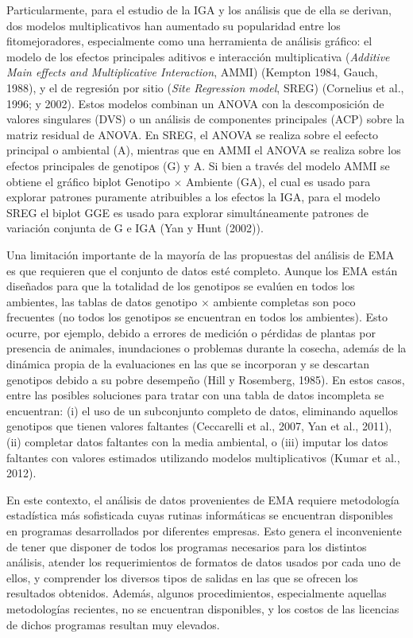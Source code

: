Particularmente, para el estudio de la IGA y los análisis que de ella se derivan, dos modelos multiplicativos han aumentado su popularidad entre los fitomejoradores, especialmente como una herramienta de análisis gráfico: el modelo de los efectos principales aditivos e interacción multiplicativa (\emph{Additive Main effects and Multiplicative Interaction}, AMMI) (Kempton 1984, Gauch, 1988), y el de regresión por sitio (\emph{Site Regression model}, SREG) (Cornelius et al., 1996; \citet{GauchZobel1997} y 2002).  Estos modelos combinan un ANOVA con la descomposición de valores singulares (DVS) o un análisis de componentes principales (ACP) sobre la matriz residual de ANOVA. En SREG, el ANOVA se realiza sobre el eefecto principal o ambiental (A),  mientras que en AMMI el ANOVA se realiza sobre los efectos principales de genotipos (G) y A. Si bien a través del modelo AMMI se obtiene el gráfico biplot Genotipo $\times$ Ambiente (GA), el cual es usado para explorar patrones puramente atribuibles a los efectos la IGA, para el modelo SREG el biplot GGE es usado para explorar simultáneamente patrones de variación conjunta de G e IGA (Yan y Hunt (2002)).

Una limitación importante de la mayoría de las propuestas del análisis de EMA es que requieren que el conjunto de datos esté completo. Aunque los EMA están diseñados para que la totalidad de los genotipos se evalúen en todos los ambientes,  las tablas de datos genotipo $\times$ ambiente completas son poco frecuentes (no todos los genotipos se encuentran en todos los ambientes). Esto ocurre, por ejemplo, debido a errores de medición o pérdidas de plantas por presencia de animales, inundaciones o problemas durante la cosecha, además de la dinámica propia de la evaluaciones en las que se incorporan y se descartan genotipos debido a su pobre desempeño (Hill y Rosemberg, 1985). En estos casos, entre las posibles soluciones para tratar con una tabla de datos incompleta se encuentran: (i) el uso de un subconjunto completo de datos, eliminando aquellos genotipos que tienen valores faltantes (Ceccarelli et al., 2007, Yan et al., 2011), (ii) completar datos faltantes con la media ambiental, o (iii) imputar los datos faltantes con valores estimados utilizando modelos multiplicativos (Kumar et al., 2012). 



En este contexto, el análisis de datos provenientes de EMA requiere metodología estadística más sofisticada cuyas rutinas informáticas se encuentran disponibles en programas desarrollados por diferentes empresas. Esto genera el inconveniente de tener que disponer de todos los programas necesarios para los distintos análisis, atender los requerimientos de formatos de datos usados por cada uno de ellos, y comprender los diversos tipos de salidas en las que se ofrecen los resultados obtenidos. Además, algunos procedimientos, especialmente aquellas metodologías recientes, no se encuentran disponibles, y los costos de las licencias de dichos programas resultan muy elevados. 

